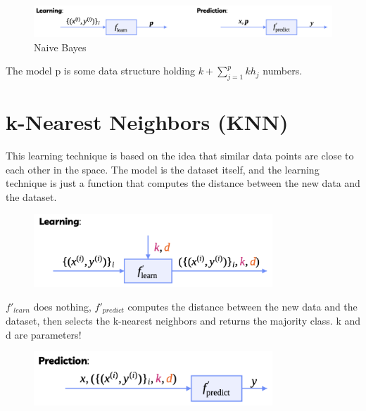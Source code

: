\begin{center}
    \begin{figure}[H]
        \centering
        \includegraphics[width=1\textwidth]{assets/fig32.png}
        \caption{Naive Bayes}
    \end{figure}
\end{center}

The model p is some data structure holding $k + \sum_{j=1}^{p}kh_j$ numbers.

\section{k-Nearest Neighbors (KNN)}

This learning technique is based on the idea that similar data points are close to each other in the space. The model is the dataset itself, and the learning technique is just a function that computes the distance between the new data and the dataset.

\begin{center}
    \begin{figure}[H]
        \centering
        \includegraphics[width=0.8\textwidth]{assets/fig33.png}
    \end{figure}
\end{center}

$f'_{learn}$ does nothing, $f'_{predict}$ computes the distance between the new data and the dataset, then selects the k-nearest neighbors and returns the majority class. k and d are parameters!

\begin{center}
    \begin{figure}[H]
        \centering
        \includegraphics[width=0.8\textwidth]{assets/fig34.png}
    \end{figure}
\end{center}

